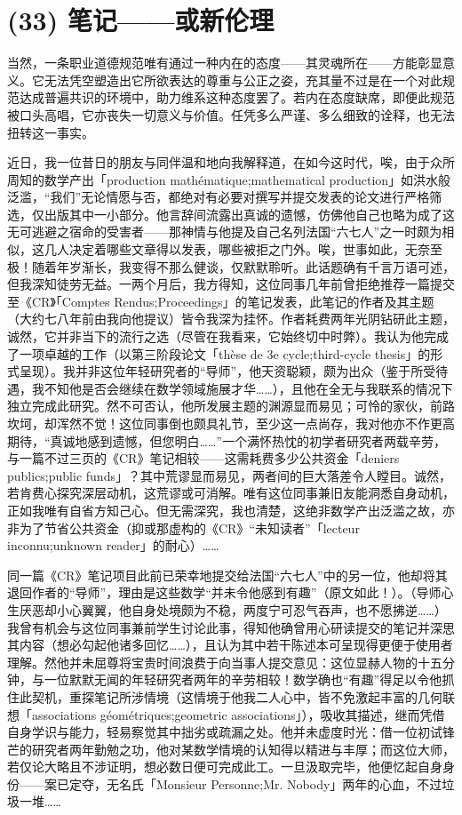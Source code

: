 \section{(33) 笔记——或新伦理}

当然，一条职业道德规范唯有通过一种内在的态度——其灵魂所在——方能彰显意义。它无法凭空塑造出它所欲表达的尊重与公正之姿，充其量不过是在一个对此规范达成普遍共识的环境中，助力维系这种态度罢了。若内在态度缺席，即便此规范被口头高唱，它亦丧失一切意义与价值。任凭多么严谨、多么细致的诠释，也无法扭转这一事实。

近日，我一位昔日的朋友与同伴温和地向我解释道，在如今这时代，唉，由于众所周知的数学产出「production mathématique;mathematical production」如洪水般泛滥，“我们”无论情愿与否，都绝对有必要对撰写并提交发表的论文进行严格筛选，仅出版其中一小部分。他言辞间流露出真诚的遗憾，仿佛他自己也略为成了这无可逃避之宿命的受害者——那神情与他提及自己名列法国“六七人”之一时颇为相似，这几人决定着哪些文章得以发表，哪些被拒之门外。唉，世事如此，无奈至极！随着年岁渐长，我变得不那么健谈，仅默默聆听。此话题确有千言万语可述，但我深知徒劳无益。一两个月后，我方得知，这位同事几年前曾拒绝推荐一篇提交至《CR》「Comptes Rendus;Proceedings」的笔记发表，此笔记的作者及其主题（大约七八年前由我向他提议）皆令我深为挂怀。作者耗费两年光阴钻研此主题，诚然，它并非当下的流行之选（尽管在我看来，它始终切中时弊）。我认为他完成了一项卓越的工作（以第三阶段论文「thèse de 3e cycle;third-cycle thesis」的形式呈现）。我并非这位年轻研究者的“导师”，他天资聪颖，颇为出众（鉴于所受待遇，我不知他是否会继续在数学领域施展才华……），且他在全无与我联系的情况下独立完成此研究。然不可否认，他所发展主题的渊源显而易见；可怜的家伙，前路坎坷，却浑然不觉！这位同事倒也颇具礼节，至少这一点尚存，我对他亦不作更高期待，“真诚地感到遗憾，但您明白……”一个满怀热忱的初学者研究者两载辛劳，与一篇不过三页的《CR》笔记相较——这需耗费多少公共资金「deniers publics;public funds」？其中荒谬显而易见，两者间的巨大落差令人瞠目。诚然，若肯费心探究深层动机，这荒谬或可消解。唯有这位同事兼旧友能洞悉自身动机，正如我唯有自省方知己心。但无需深究，我也清楚，这绝非数学产出泛滥之故，亦非为了节省公共资金（抑或那虚构的《CR》“未知读者”「lecteur inconnu;unknown reader」的耐心）……

同一篇《CR》笔记项目此前已荣幸地提交给法国“六七人”中的另一位，他却将其退回作者的“导师”，理由是这些数学“并未令他感到有趣”（原文如此！）。（导师心生厌恶却小心翼翼，他自身处境颇为不稳，两度宁可忍气吞声，也不愿拂逆……）我曾有机会与这位同事兼前学生讨论此事，得知他确曾用心研读提交的笔记并深思其内容（想必勾起他诸多回忆……），且认为其中若干陈述本可呈现得更便于使用者理解。然他并未屈尊将宝贵时间浪费于向当事人提交意见：这位显赫人物的十五分钟，与一位默默无闻的年轻研究者两年的辛劳相较！数学确也“有趣”得足以令他抓住此契机，重探笔记所涉情境（这情境于他我二人心中，皆不免激起丰富的几何联想「associations géométriques;geometric associations」），吸收其描述，继而凭借自身学识与能力，轻易察觉其中拙劣或疏漏之处。他并未虚度时光：借一位初试锋芒的研究者两年勤勉之功，他对某数学情境的认知得以精进与丰厚；而这位大师，若仅论大略且不涉证明，想必数日便可完成此工。一旦汲取完毕，他便忆起自身身份——案已定夺，无名氏「Monsieur Personne;Mr. Nobody」两年的心血，不过垃圾一堆……

